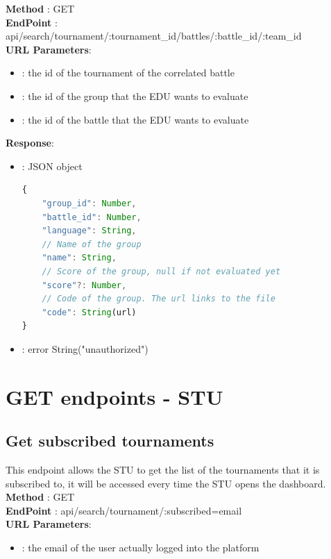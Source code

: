 \textbf{Method} : GET \\
\textbf{EndPoint} : api/search/tournament/:tournament\_id/battles/:battle\_id/:team\_id     \\
\textbf{URL Parameters}:
\begin{itemize}
    \item {} : the id of the tournament of the correlated battle
    \item {}: the id of the group that the EDU wants to evaluate
    \item {}: the id of the battle that the EDU wants to evaluate
\end{itemize}
\textbf{Response}:
\begin{itemize}
    \item {} : JSON object
          \begin{lstlisting}[language=JavaScript, label={lst:jscode}, basicstyle=\ttfamily]
{
    "group_id": Number,
    "battle_id": Number,
    "language": String,
    // Name of the group
    "name": String,
    // Score of the group, null if not evaluated yet
    "score"?: Number,
    // Code of the group. The url links to the file
    "code": String(url)
}
    \end{lstlisting}
    \item {} : error String("unauthorized")
\end{itemize}

\section*{GET endpoints - STU}

\subsection*{Get subscribed tournaments}
This endpoint allows the STU to get the list of the tournaments that it is subscribed to, it will be accessed every time the STU opens the dashboard.\\

\textbf{Method} : GET \\
\textbf{EndPoint} : api/search/tournament/:subscribed=email     \\
\textbf{URL Parameters}:
    \begin{itemize}
        \item {} : the email of the user actually logged into the platform
    \end{itemize}

